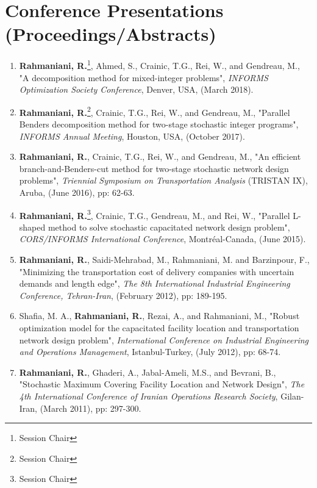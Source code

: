 \documentclass[10PT,letter]{article}
\newcommand{\numbox}[1]{} %
\begin{document}
\section*{\numbox{3}\bfseries\textcolor{titlecol}{\sffamily Conference Presentations (Proceedings/Abstracts) }}    
		\begin{enumerate}
			\item 
				\textbf{Rahmaniani, R.}\footnote{Session Chair}, Ahmed, S., Crainic, T.G., Rei, W., and Gendreau, M., "A decomposition method for mixed-integer problems", \textit{INFORMS Optimization Society Conference}, Denver, USA, (March 2018).
			\item 
				\textbf{Rahmaniani, R.}\footnote{Session Chair}, Crainic, T.G., Rei, W., and Gendreau, M., "Parallel Benders decomposition method for two-stage stochastic integer programs", \textit{INFORMS Annual Meeting}, Houston, USA, (October 2017).
			\item 
					\textbf{Rahmaniani, R.}, Crainic, T.G., Rei, W., and Gendreau, M., "An efficient branch-and-Benders-cut method for two-stage stochastic network design problems", \textit{Triennial Symposium on Transportation Analysis} (TRISTAN IX), Aruba, (June 2016), pp: 62-63.
			\item 
					\textbf{Rahmaniani, R.}\footnote{Session Chair}, Crainic, T.G., Gendreau, M., and Rei, W., "Parallel L-shaped method to solve stochastic capacitated network design problem", \textit{CORS/INFORMS International Conference}, Montréal-Canada, (June 2015).
			\item 
					\textbf{Rahmaniani, R.}, Saidi-Mehrabad, M., Rahmaniani, M. and Barzinpour, F., "Minimizing the transportation cost of delivery companies with uncertain demands and length edge", \textit{The 8th International Industrial Engineering Conference, Tehran-Iran}, (February 2012), pp: 189-195.
			\item 
					Shafia, M. A., \textbf{Rahmaniani, R.}, Rezai, A., and Rahmaniani, M., "Robust optimization model for the capacitated facility location and transportation network design problem",\textit{ International Conference on Industrial Engineering and Operations Management}, Istanbul-Turkey, (July 2012), pp: 68-74.
			\item
				\textbf{	Rahmaniani, R.}, Ghaderi, A., Jabal-Ameli, M.S., and Bevrani, B., "Stochastic Maximum Covering Facility Location and Network Design", \textit{The 4th International Conference of Iranian Operations Research Society}, Gilan-Iran, (March 2011), pp: 297-300.
		\end{enumerate}
                    
\end{document}
